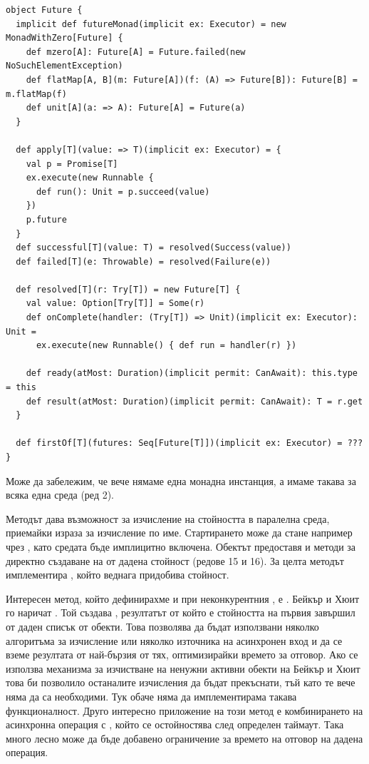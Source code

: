 \begin{lstlisting}[style=listing, caption={Конкурентен \englishterm{future} (съпътстващ обект)}]
object Future {
  implicit def futureMonad(implicit ex: Executor) = new MonadWithZero[Future] {
    def mzero[A]: Future[A] = Future.failed(new NoSuchElementException)
    def flatMap[A, B](m: Future[A])(f: (A) => Future[B]): Future[B] = m.flatMap(f)
    def unit[A](a: => A): Future[A] = Future(a)
  }

  def apply[T](value: => T)(implicit ex: Executor) = {
    val p = Promise[T]
    ex.execute(new Runnable {
      def run(): Unit = p.succeed(value)
    })
    p.future
  }
  def successful[T](value: T) = resolved(Success(value))
  def failed[T](e: Throwable) = resolved(Failure(e))

  def resolved[T](r: Try[T]) = new Future[T] {
    val value: Option[Try[T]] = Some(r)
    def onComplete(handler: (Try[T]) => Unit)(implicit ex: Executor): Unit =
      ex.execute(new Runnable() { def run = handler(r) })

    def ready(atMost: Duration)(implicit permit: CanAwait): this.type = this
    def result(atMost: Duration)(implicit permit: CanAwait): T = r.get
  }

  def firstOf[T](futures: Seq[Future[T]])(implicit ex: Executor) = ???
}
\end{lstlisting}

Може да забележим, че вече нямаме една монадна инстанция, а имаме такава за всяка една среда (ред 2).

Методът  дава възможност за изчисление на стойността в паралелна среда, приемайки израза за изчисление по име. Стартирането може да стане например чрез , като средата бъде имплицитно включена. Обектът предоставя и методи за директно създаване на  от дадена стойност (редове 15 и 16). За целта методът  имплементира , който веднага придобива стойност.

Интересен метод, който дефинирахме и при неконкурентния , е . Бейкър и Хюит го наричат . Той създава , резултатът от който е стойността на първия завършил  от даден списък от  обекти. Това позволява да бъдат използвани няколко алгоритъма за изчисление или няколко източника на асинхронен вход и да се вземе резултата от най-бързия от тях, оптимизирайки времето за отговор. Ако се използва механизма за изчистване на ненужни активни  обекти на Бейкър и Хюит това би позволило останалите изчисления да бъдат прекъснати, тъй като те вече няма да са необходими. Тук обаче няма да имплементирама такава функционалност. Друго интересно приложение на този метод е комбинирането на асинхронна операция с , който се остойностява след определен таймаут. Така много лесно може да бъде добавено ограничение за времето на отговор на дадена операция.

